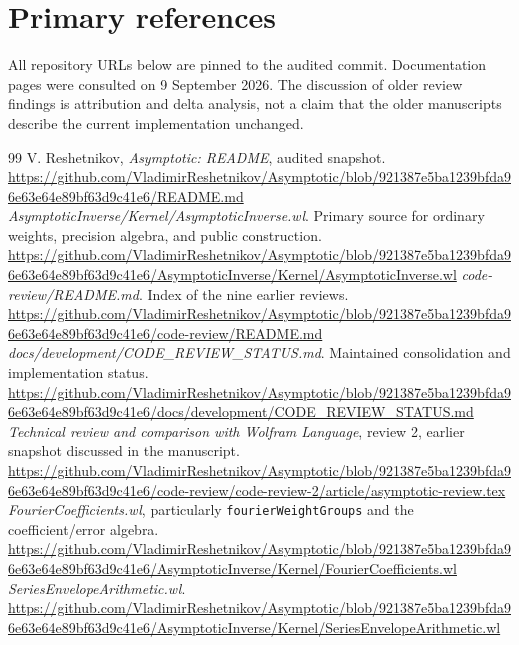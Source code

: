\documentclass[11pt,letterpaper]{article}
\newcommand{\code}[1]{{\small\nolinkurl{#1}}}
\begin{document}
\clearpage
\section{Primary references}
All repository URLs below are pinned to the audited commit. Documentation pages were consulted on 9 September 2026. The discussion of older review findings is attribution and delta analysis, not a claim that the older manuscripts describe the current implementation unchanged.
\begin{thebibliography}{99}
 V. Reshetnikov, \emph{Asymptotic: README}, audited snapshot.\newline
\url{https://github.com/VladimirReshetnikov/Asymptotic/blob/921387e5ba1239bfda96e63e64e89bf63d9c41e6/README.md}
 \emph{AsymptoticInverse/Kernel/AsymptoticInverse.wl}. Primary source for ordinary weights, precision algebra, and public construction.\newline
\url{https://github.com/VladimirReshetnikov/Asymptotic/blob/921387e5ba1239bfda96e63e64e89bf63d9c41e6/AsymptoticInverse/Kernel/AsymptoticInverse.wl}
 \emph{code-review/README.md}. Index of the nine earlier reviews.\newline
\url{https://github.com/VladimirReshetnikov/Asymptotic/blob/921387e5ba1239bfda96e63e64e89bf63d9c41e6/code-review/README.md}
 \emph{docs/development/CODE\_REVIEW\_STATUS.md}. Maintained consolidation and implementation status.\newline
\url{https://github.com/VladimirReshetnikov/Asymptotic/blob/921387e5ba1239bfda96e63e64e89bf63d9c41e6/docs/development/CODE_REVIEW_STATUS.md}
 \emph{Technical review and comparison with Wolfram Language}, review 2, earlier snapshot discussed in the manuscript.\newline
\url{https://github.com/VladimirReshetnikov/Asymptotic/blob/921387e5ba1239bfda96e63e64e89bf63d9c41e6/code-review/code-review-2/article/asymptotic-review.tex}
 \emph{FourierCoefficients.wl}, particularly \code{fourierWeightGroups} and the coefficient/error algebra.\newline
\url{https://github.com/VladimirReshetnikov/Asymptotic/blob/921387e5ba1239bfda96e63e64e89bf63d9c41e6/AsymptoticInverse/Kernel/FourierCoefficients.wl}
 \emph{SeriesEnvelopeArithmetic.wl}.\newline
\url{https://github.com/VladimirReshetnikov/Asymptotic/blob/921387e5ba1239bfda96e63e64e89bf63d9c41e6/AsymptoticInverse/Kernel/SeriesEnvelopeArithmetic.wl}

\end{thebibliography}
\end{document}
